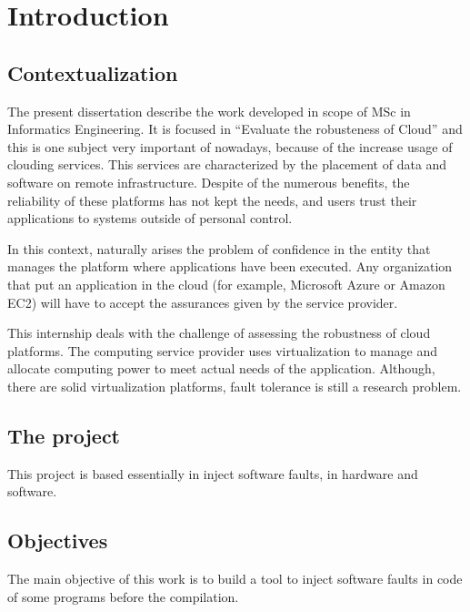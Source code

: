 \newpage
\section{Introduction}

\subsection{Contextualization}
The present dissertation describe the work developed in scope of MSc in Informatics Engineering. It is focused in ``Evaluate the robusteness of Cloud'' and this is one subject very important of nowadays, because of the increase usage of clouding services.
This services are characterized by the placement of data and software on remote infrastructure. Despite of the numerous benefits, the reliability of these platforms has not kept the needs, and users trust their applications to systems outside of personal control. 

In this context, naturally arises the problem of confidence in the entity that manages the platform where applications have been executed. Any organization that put an application in the cloud (for example, Microsoft Azure or Amazon EC2) will have to accept the assurances given by the service provider.

This internship deals with the challenge of assessing the robustness of cloud platforms. The computing service provider uses virtualization to manage and allocate computing power to meet actual needs of the application. Although, there are solid virtualization platforms, fault tolerance is still a research problem.



\subsection{The project}

This project is based essentially in inject software faults, in hardware and software.

\subsection{Objectives}

The main objective of this work is to build a tool to inject software faults in code of some programs before the compilation.

